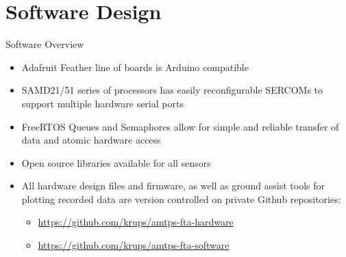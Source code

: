\documentclass[UKenglish]{beamer}
\begin{document}
\section{Software Design}
\begin{frame}{Software Overview}
	
	\begin{itemize}
		\item Adafruit Feather line of boards is Arduino compatible
		\item SAMD21/51 series of processors has easily reconfigurable SERCOMs to support multiple hardware serial ports 
		\item FreeRTOS Queues and Semaphores allow for simple and reliable transfer of data and atomic hardware access
		\item Open source libraries available for all sensors
		\item All hardware design files and firmware, as well as ground assist tools for plotting recorded data are version controlled on private Github repositories:
		\begin{itemize}
			\item \url{https://github.com/krups/amtps-fta-hardware}
			\item \url{https://github.com/krups/amtps-fta-software}
		\end{itemize}	
	\end{itemize}
	
\end{frame}
\end{document}
